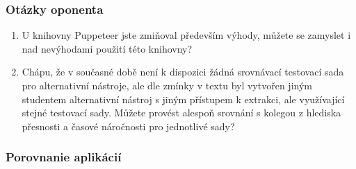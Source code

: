 \documentclass[10pt,xcolor=pdflatex]{beamer}
\begin{document}
\begin{frame}\frametitle{Otázky oponenta}
    \begin{enumerate}
        \item U knihovny Puppeteer jste zmiňoval především výhody, můžete se zamyslet i nad nevýhodami použití této knihovny?
        \bigskip
        \item Chápu, že v současné době není k dispozici žádná srovnávací testovací sada pro alternativní nástroje, ale dle zmínky v textu byl vytvořen jiným studentem alternativní nástroj s jiným přístupem k extrakci, ale využívající stejné testovací sady. Můžete provést alespoň srovnání s kolegou z hlediska přesnosti a časové náročnosti pro jednotlivé sady?
    \end{enumerate}
\end{frame}

\begin{frame}\frametitle{Porovnanie aplikácií}
    \bgroup
    \def\arraystretch{1.5}
    \begin{table}[hbt]
        \caption{Porovnanie dvoch odlišných prístupov k extrakcii}
        \centering
{}
    \end{table}
    \egroup
\end{frame}

\end{document}
